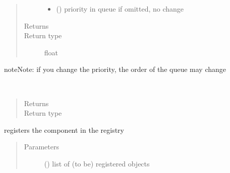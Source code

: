 \documentclass[letterpaper,10pt,english]{sphinxmanual}
\begin{document}
\begin{fulllineitems}
\begin{fulllineitems}
\begin{quote}
\begin{description}
\begin{itemize}
\item {} 
 () \textendash{} priority in queue 
if omitted, no change

\end{itemize}

\item[{Returns}] \leavevmode
{}

\item[{Return type}] \leavevmode
float

\end{description}\end{quote}

\begin{sphinxadmonition}{note}{Note:}
if you change the priority, the order of the queue may change
\end{sphinxadmonition}

\end{fulllineitems}


\begin{fulllineitems}
\label{\detokenize{Reference:salabim.Component.queues}}~\begin{quote}\begin{description}
\item[{Returns}] \leavevmode
{}

\item[{Return type}] \leavevmode
{\hyperref[\detokenize{Reference:salabim.State.set}]{}}

\end{description}\end{quote}

\end{fulllineitems}


\begin{fulllineitems}
\label{\detokenize{Reference:salabim.Component.register}}
registers the component in the registry
\begin{quote}\begin{description}
\item[{Parameters}] \leavevmode
{} () \textendash{} list of (to be) registered objects


\end{description}
\end{quote}
\end{fulllineitems}
\end{fulllineitems}
\end{document}
